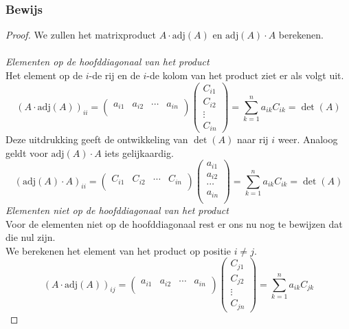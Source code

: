 \documentclass[lineaire_algebra_oplossingen.tex]{subfiles}
\begin{document}
\subsubsection*{Bewijs}
\begin{proof}
We zullen het matrixproduct $A\cdot \text{adj}(A)$ en $\text{adj}(A) \cdot A$ berekenen.\\\\
\emph{Elementen op de hoofddiagonaal van het product}\\
Het element op de $i$-de rij en de $i$-de kolom van het product ziet er als volgt uit.
\[
(A\cdot \text{adj}(A))_{ii} =
\begin{pmatrix}
a_{i1} & a_{i2}&\cdots&a_{in}\\
\end{pmatrix}
\begin{pmatrix}
C_{i1}\\C_{i2}\\\vdots\\C_{in}
\end{pmatrix}
=
\sum_{k=1}^na_{ik}C_{ik} = \det(A)
\]
Deze uitdrukking geeft de ontwikkeling van $\det(A)$ naar rij $i$ weer.
Analoog geldt voor $\text{adj}(A) \cdot A$ iets gelijkaardig.
\[
(\text{adj}(A) \cdot A)_{ii} =
\begin{pmatrix}
C_{i1}&C_{i2}&\cdots&C_{in}\\
\end{pmatrix}
\begin{pmatrix}
a_{i1}\\a_{i2}\\\cdots\\a_{in}\\
\end{pmatrix}
=
\sum_{k=1}^na_{ik}C_{ik} = \det(A)
\]
\emph{Elementen niet op de hoofddiagonaal van het product}\\
Voor de elementen niet op de hoofddiagonaal rest er ons nu nog te bewijzen dat die nul zijn.\\
We berekenen het element van het product op positie $i\neq j$.
\[
(A\cdot \text{adj}(A))_{ij} =
\begin{pmatrix}
a_{i1} & a_{i2}&\cdots&a_{in}\\
\end{pmatrix}
\begin{pmatrix}
C_{j1}\\C_{j2}\\\vdots\\C_{jn}
\end{pmatrix}
=
\sum_{k=1}^na_{ik}C_{jk}
\]
\end{proof}
\end{document}

